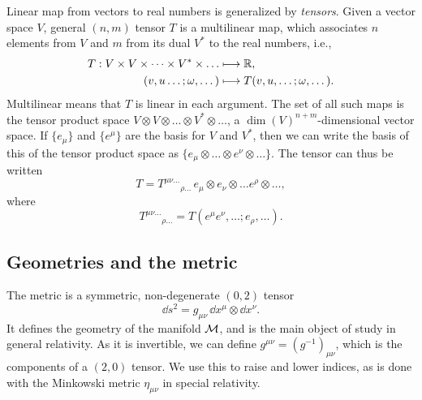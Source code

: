 Linear map from vectors to real numbers is  generalized by \emph{tensors}.
Given a vector space $V$, general $(n, m)$ tensor $T$ is a multilinear map, which associates $n$ elements from $V$ and $m$ from its dual $V^*$ to the real numbers, i.e.,
%
\begin{align}
    T: V \times V \times \dots\times V^* \times \dots &\longmapsto \mathbb{R}, \\
    (v, u\dots; \omega, \dots) & \longmapsto T(v, u, \dots; \omega, \dots).
\end{align}
%
Multilinear means that $T$ is linear in each argument.
The set of all such maps is the tensor product space $V\otimes V \otimes \dots \otimes V^* \otimes \dots$, a $\dim(V)^{n+m}$-dimensional vector space.
If $\{e_\mu\}$ and $\{e^\mu\}$ are the basis for $V$ and $V^*$, then we can write the basis of this of the tensor product space as $ \{e_{\mu} \otimes\dots \otimes e^{\nu} \otimes \dots \}$.
The tensor can thus be written
%
\begin{equation}
    T = T^{\mu \nu\dots}{}_{\rho\dots} \, e_{\mu}\otimes e_\nu \otimes \dots e^\rho\otimes\dots, 
\end{equation}
% 
where
%
\begin{equation}
    T^{\mu \nu\dots}{}_{\rho\dots} = T(e^\mu e^\nu, \dots; e_\rho, \dots).
\end{equation}


\subsection*{Geometries and the metric}

The metric is a symmetric, non-degenerate $(0, 2)$ tensor
%
\begin{equation}
    \dd s^2 = g_{\mu \nu} \, \dd x^\mu \otimes \dd x^\nu.
\end{equation}
%
It defines the geometry of the manifold $\mathcal{M}$, and is the main object of study in general relativity.
As it is invertible, we can define $g^{\mu \nu} = (g^{-1})_{\mu \nu}$, which is the components of a $(2, 0)$ tensor.
We use this to raise and lower indices, as is done with the Minkowski metric $\eta_{\mu \nu}$ in special relativity.

